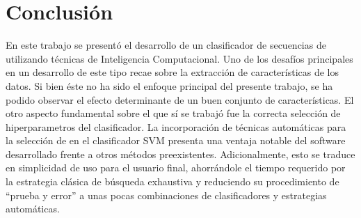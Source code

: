 %
%
%
%
\chapter{Conclusión}
%
En este trabajo se presentó el desarrollo de un clasificador de
secuencias de  utilizando técnicas de Inteligencia
Computacional.
Uno de los desafíos principales en un desarrollo de este tipo
recae sobre la extracción de características de los datos.
Si bien éste no ha sido el enfoque principal del presente trabajo, se
ha podido observar el efecto determinante de un buen conjunto de
características.
El otro aspecto fundamental sobre el que sí se trabajó fue la correcta
selección de hiperparametros del clasificador.
La incorporación de técnicas automáticas para la selección de
 en el clasificador SVM presenta una ventaja notable del
software desarrollado frente a otros métodos preexistentes.
Adicionalmente, esto se traduce en simplicidad de uso para el usuario
final, ahorrándole el tiempo requerido por la estrategia clásica de
búsqueda exhaustiva y reduciendo su procedimiento de ``prueba y
error'' a unas pocas combinaciones de clasificadores y estrategias
automáticas.
